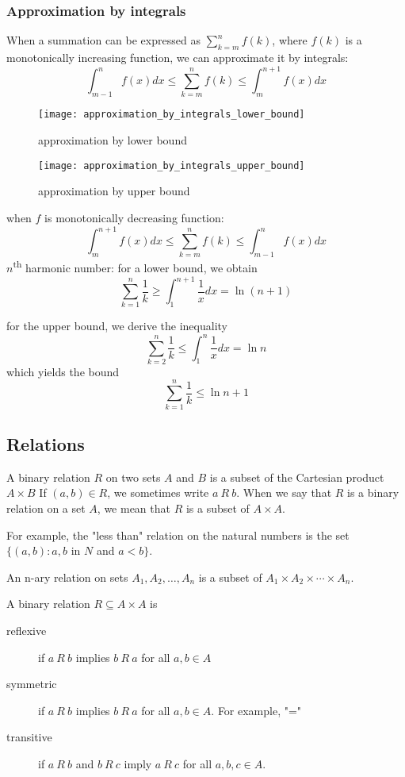 \documentclass{article}
\begin{document}
\subsubsection{Approximation by integrals}
When a summation can be expressed as $\sum_{k=m}^n f(k)$, where $f(k)$ is a monotonically increasing function, we can approximate it by integrals:
$$
\int_{m-1}^n f(x)dx \leq \sum_{k=m}^n f(k) \leq \int_m^{n+1} f(x)dx
$$

\begin{figure}[htbp]
\begin{minipage}[t]{0.5\textwidth}
	\centering
	\texttt{[image: approximation\_by\_integrals\_lower\_bound]}
  	\caption{approximation by lower bound}
  	\label{fig.approximation_by_integrals_lower_bound}
\end{minipage}
\begin{minipage}[t]{0.5\textwidth}
	\centering
	\texttt{[image: approximation\_by\_integrals\_upper\_bound]}
  	\caption{approximation by upper bound}
  	\label{fig.approximation_by_integrals_upper_bound}
\end{minipage}
\end{figure}
when $f$ is monotonically decreasing function:
$$
\int_m^{n+1} f(x)dx \leq \sum_{k=m}^n f(k) \leq \int_{m-1}^n f(x)dx
$$
$n$\textsuperscript{th} harmonic number:
for a lower bound, we obtain
$$
\sum_{k=1}^n \frac{1}{k} \geq \int_1^{n+1}\frac{1}{x}dx = \ln(n+1)
$$

for the upper bound, we derive the inequality
$$
\sum_{k=2}^n \frac{1}{k} \leq \int_1^{n}\frac{1}{x}dx = \ln n
$$
which yields the bound
$$
\sum_{k=1}^n \frac{1}{k} \leq \ln n + 1
$$

\subsection{Relations}
A binary relation $R$ on two sets $A$ and $B$ is a subset of the Cartesian product $A \times B$
If $(a, b) \in R$, we sometimes write $a\ R\ b$. When we say that $R$ is a binary relation on a set $A$, we mean that $R$ is a subset of $A \times A$.

For example, the "less than" relation on the natural numbers is the set $\{(a, b) : a, b$ in $N$ and $a < b\}$.

An n-ary relation on sets $A_1, A_2,\ldots, A_n$ is a subset of $A_1 \times A_2 \times \cdots \times  A_n$.

A binary relation $R \subseteq A \times A$ is
\begin{description}
  \item[reflexive] if $a\ R\ b$ implies $b\ R\ a$ for all $a,b \in A$
  \item[symmetric] if $a\ R\ b$ implies $b\ R\ a$ for all $a, b \in A$. For example, "="
  \item[transitive] if $a\ R\ b$ and $b\ R\ c$ imply $a\ R\ c$ for all $a, b, c \in A$.
\end{description}
\end{document}
